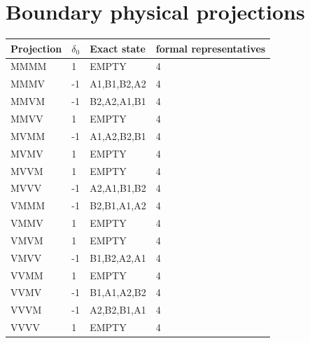 \documentclass[10pt]{article}
\begin{document}
\section*{Boundary physical projections}
\begin{tabular}{llll}
\toprule
Projection & $\delta_0$ & Exact state & formal representatives \\
\midrule
MMMM & 1 & EMPTY & 4 \\
MMMV & -1 & A1,B1,B2,A2 & 4 \\
MMVM & -1 & B2,A2,A1,B1 & 4 \\
MMVV & 1 & EMPTY & 4 \\
MVMM & -1 & A1,A2,B2,B1 & 4 \\
MVMV & 1 & EMPTY & 4 \\
MVVM & 1 & EMPTY & 4 \\
MVVV & -1 & A2,A1,B1,B2 & 4 \\
VMMM & -1 & B2,B1,A1,A2 & 4 \\
VMMV & 1 & EMPTY & 4 \\
VMVM & 1 & EMPTY & 4 \\
VMVV & -1 & B1,B2,A2,A1 & 4 \\
VVMM & 1 & EMPTY & 4 \\
VVMV & -1 & B1,A1,A2,B2 & 4 \\
VVVM & -1 & A2,B2,B1,A1 & 4 \\
VVVV & 1 & EMPTY & 4 \\
\bottomrule
\end{tabular}
\end{document}
